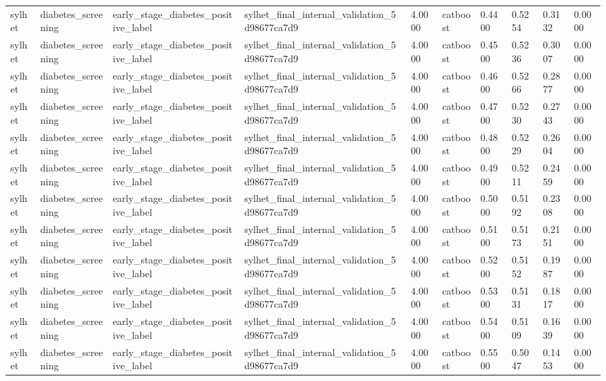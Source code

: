 \begin{tabular}{llllllllll}
sylhet & diabetes\_screening & early\_stage\_diabetes\_positive\_label & sylhet\_final\_internal\_validation\_5d98677ca7d9 & 4.0000 & catboost & 0.4400 & 0.5254 & 0.3132 & 0.0000 \\
sylhet & diabetes\_screening & early\_stage\_diabetes\_positive\_label & sylhet\_final\_internal\_validation\_5d98677ca7d9 & 4.0000 & catboost & 0.4500 & 0.5236 & 0.3007 & 0.0000 \\
sylhet & diabetes\_screening & early\_stage\_diabetes\_positive\_label & sylhet\_final\_internal\_validation\_5d98677ca7d9 & 4.0000 & catboost & 0.4600 & 0.5266 & 0.2877 & 0.0000 \\
sylhet & diabetes\_screening & early\_stage\_diabetes\_positive\_label & sylhet\_final\_internal\_validation\_5d98677ca7d9 & 4.0000 & catboost & 0.4700 & 0.5230 & 0.2743 & 0.0000 \\
sylhet & diabetes\_screening & early\_stage\_diabetes\_positive\_label & sylhet\_final\_internal\_validation\_5d98677ca7d9 & 4.0000 & catboost & 0.4800 & 0.5229 & 0.2604 & 0.0000 \\
sylhet & diabetes\_screening & early\_stage\_diabetes\_positive\_label & sylhet\_final\_internal\_validation\_5d98677ca7d9 & 4.0000 & catboost & 0.4900 & 0.5211 & 0.2459 & 0.0000 \\
sylhet & diabetes\_screening & early\_stage\_diabetes\_positive\_label & sylhet\_final\_internal\_validation\_5d98677ca7d9 & 4.0000 & catboost & 0.5000 & 0.5192 & 0.2308 & 0.0000 \\
sylhet & diabetes\_screening & early\_stage\_diabetes\_positive\_label & sylhet\_final\_internal\_validation\_5d98677ca7d9 & 4.0000 & catboost & 0.5100 & 0.5173 & 0.2151 & 0.0000 \\
sylhet & diabetes\_screening & early\_stage\_diabetes\_positive\_label & sylhet\_final\_internal\_validation\_5d98677ca7d9 & 4.0000 & catboost & 0.5200 & 0.5152 & 0.1987 & 0.0000 \\
sylhet & diabetes\_screening & early\_stage\_diabetes\_positive\_label & sylhet\_final\_internal\_validation\_5d98677ca7d9 & 4.0000 & catboost & 0.5300 & 0.5131 & 0.1817 & 0.0000 \\
sylhet & diabetes\_screening & early\_stage\_diabetes\_positive\_label & sylhet\_final\_internal\_validation\_5d98677ca7d9 & 4.0000 & catboost & 0.5400 & 0.5109 & 0.1639 & 0.0000 \\
sylhet & diabetes\_screening & early\_stage\_diabetes\_positive\_label & sylhet\_final\_internal\_validation\_5d98677ca7d9 & 4.0000 & catboost & 0.5500 & 0.5047 & 0.1453 & 0.0000 \\

\end{tabular}
